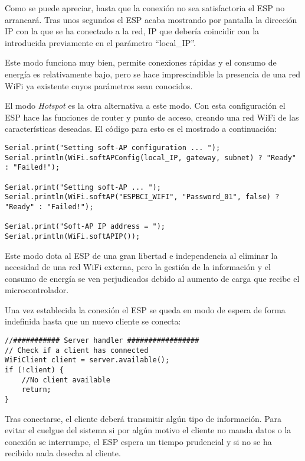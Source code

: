Como se puede apreciar, hasta que la conexión no sea satisfactoria el ESP no arrancará. Tras unos segundos el ESP acaba mostrando por pantalla la dirección IP con la que se ha conectado a la red, IP que debería coincidir con la introducida previamente en el parámetro ``local\_IP''.

Este modo funciona muy bien, permite conexiones rápidas y el consumo de energía es relativamente bajo, pero se hace imprescindible la presencia de una red WiFi ya existente cuyos parámetros sean conocidos.

El modo \textit{Hotspot} es la otra alternativa a este modo. Con esta configuración el ESP hace las funciones de router y punto de acceso, creando una red WiFi de las características deseadas. El código para esto es el mostrado a continuación:

\begin{lstlisting}[label=algoritmo:ESP_Hotspot,style = STM-code,frame=single,caption=Creacion de un punto de acceso en el ESP]
Serial.print("Setting soft-AP configuration ... ");
Serial.println(WiFi.softAPConfig(local_IP, gateway, subnet) ? "Ready" : "Failed!");

Serial.print("Setting soft-AP ... ");
Serial.println(WiFi.softAP("ESPBCI_WIFI", "Password_01", false) ? "Ready" : "Failed!");

Serial.print("Soft-AP IP address = ");
Serial.println(WiFi.softAPIP());
\end{lstlisting}

Este modo dota al ESP de una gran libertad e independencia al eliminar la necesidad de una red WiFi externa, pero la gestión de la información y el consumo de energía se ven perjudicados debido al aumento de carga que recibe el microcontrolador.

Una vez establecida la conexión el ESP se queda en modo de espera de forma indefinida hasta que un nuevo cliente se conecta:

\begin{lstlisting}[label=algoritmo:ESP_Server_handler,style = STM-code,frame=single,caption=Gestión de clientes y peticiones en Arduino]
//########### Server handler #################
// Check if a client has connected
WiFiClient client = server.available();
if (!client) {
	//No client available
	return;
}
\end{lstlisting}

Tras conectarse, el cliente deberá transmitir algún tipo de información. Para evitar el cuelgue del sistema si por algún motivo el cliente no manda datos o la conexión se interrumpe, el ESP espera un tiempo prudencial y si no se ha recibido nada desecha al cliente.

